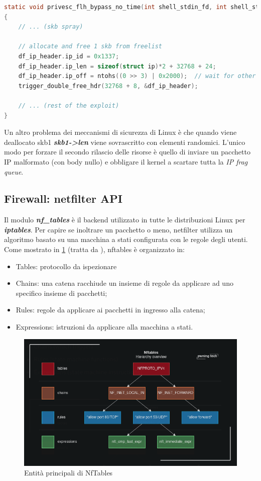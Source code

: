 \documentclass{article}
\begin{document}
\begin{lstlisting}[language=C,style=CStyle,caption="Trigger del primo free con un pacchetto frammentato (0x2000)"]
static void privesc_flh_bypass_no_time(int shell_stdin_fd, int shell_stdout_fd)
{
    // ... (skb spray)

    // allocate and free 1 skb from freelist
	df_ip_header.ip_id = 0x1337;
	df_ip_header.ip_len = sizeof(struct ip)*2 + 32768 + 24;
	df_ip_header.ip_off = ntohs((0 >> 3) | 0x2000);  // wait for other fragments. 8 >> 3 to make it wait or so?
	trigger_double_free_hdr(32768 + 8, &df_ip_header);

    // ... (rest of the exploit)
} 
\end{lstlisting}
Un altro problema dei meccanismi di sicurezza di Linux è che quando viene deallocato skb1 
\textbf{\textit{skb1->len}} viene sovrascritto con elementi randomici. L'unico modo per forzare 
il secondo rilascio delle risorse è quello di inviare un pacchetto IP malformato (con body nullo) 
e obbligare il kernel a scartare tutta la \textit{IP frag queue}.

\subsection{Firewall: netfilter API}
Il modulo \textbf{\textit{nf\_tables}} è il backend utilizzato in tutte le distribuzioni 
Linux per \textbf{\textit{iptables}}. Per capire se inoltrare un pacchetto o meno,
netfilter utilizza un algoritmo basato su una macchina a stati configurata con le regole 
degli utenti. Come mostrato in \cref{fig:nf-tables-entity} (tratta da \cite{NetfilterTablesVulnerability}), nftables è organizzato in:
\begin{itemize}
  \item Tables: protocollo da ispezionare
  \item Chains: una catena racchiude un insieme di regole da applicare ad uno specifico insieme di 
    pacchetti;
  \item Rules: regole da applicare ai pacchetti in ingresso alla catena;
  \item Expressions: istruzioni da applicare alla macchina a stati.
\end{itemize}

\begin{figure}[h]
  \begin{center}
    \includegraphics[width=.65\textwidth]{figures/ch1/nf_tables-4.png}
  \end{center}
  \caption{Entità principali di NfTables}\label{fig:nf-tables-entity}
\end{figure}
\end{document}
